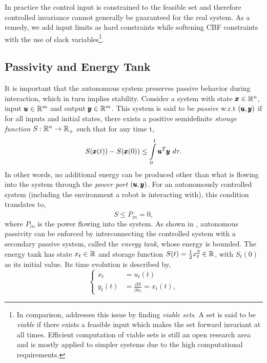 In practice the control input is constrained to the feasible set and therefore controlled invariance cannot generally be guaranteed for the real system. As a remedy, we add input limits as hard constraints while softening CBF constraints with the use of slack variables\footnote{In comparison, \cite{gurriet2018towards} addresses this issue by finding \emph{viable sets}. A set is said to be \emph{viable} if there exists a feasible input which makes the set forward invariant at all times. Efficient computation of viable sets is still an open research area and is mostly applied to simpler systems due to the high computational requirements.}.

\subsection{Passivity and Energy Tank}
It is important that the autonomous system preserves passive behavior during interaction, which in turn implies stability. Consider a system with state $\pmb{x} \in \mathbb{R}^{n}$, input $\pmb{u} \in \mathbb{R}^{m}$ and output $\pmb{y} \in \mathbb{R}^{m}$. 
This system is said to be \emph{passive} w.r.t $(\pmb{u},\pmb{y})$ if for all inputs and initial states, there exists a positive semidefinite \emph{storage function} $S: \mathbb{R}^{n} \rightarrow \mathbb{R}^{}_+$ such that for any time t,
\begin{equation}
    S(\pmb{x}(t)) - S(\pmb{x}(0))\leq \int\limits_{0}^{t} \pmb{u}^T \pmb{y}\ d\tau.  
\end{equation}
In other words, no additional energy can be produced other than what is flowing into the system through the \textit{power port} $(\pmb{u},\pmb{y})$.
For an autonomously controlled system (including the environment a robot is interacting with), this condition translates to, 
\begin{equation}
    \dot{S} \leq P_{in} = 0,
\end{equation}
where $P_{in}$ is the power flowing into the system. As shown in \cite{shahriari2018valve}, autonomous passivity can be enforced by interconnecting the controlled system with a secondary passive system, called the \emph{energy tank}, whose energy is bounded. The energy tank has state $x_t \in \mathbb{R}^{}$ and storage function $S(t) = \frac{1}{2} x_t^2 \in \mathbb{R}^{}$, with $S_t(0)$ as its initial value. Its time evolution is described by,
\begin{equation}
\begin{cases}
\dot{x}_t &= u_t(t) \\
y_t(t) &= \frac{\partial S}{\partial x_t} = x_t(t),
\end{cases}
\end{equation}
